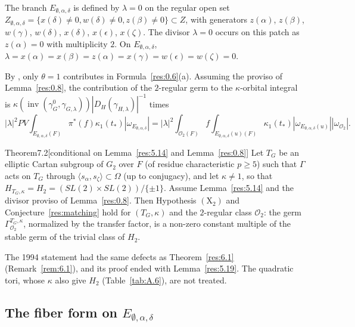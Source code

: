 \documentclass[12pt,letterpaper]{amsart}
\theoremstyle{plain}
\theoremstyle{definition}
\theoremstyle{remark}
\theoremstyle{definition}
\newcommand{\eps}{\epsilon}
\DeclareMathOperator{\inv}{inv}
\begin{document}
The branch $E_{\emptyset,\alpha,\delta}$ is defined by
$\lambda =0$ on the regular open set $Z_{\emptyset,\alpha,\delta}=
\{x(\delta)\not= 0,w(\delta)\not= 0,z(\beta)\not= 0\}\subset Z$,
with generators
$z(\alpha)$, $z(\beta)$, $w(\gamma)$, $w(\delta)$, $x(\delta)$,
$x(\epsilon)$, $x(\zeta)$. The divisor $\lambda =0$ occurs
on this patch as $z(\alpha)=0$ with multiplicity $2$.
On $E_{\emptyset,\alpha,\delta}$,
$\lambda=x(\alpha)=x(\beta)=z(\alpha)=x(\gamma)=w(\eps)=w(\zeta)=0$.

By \cite[Ch.~VI, \S2]{Ha92a}, only $\theta=1$
contributes in Formula~\ref{res:0.6}(a).
Assuming the proviso of Lemma~\ref{res:0.8}, the contribution of the
$2$-regular germ to the $\kappa$-orbital integral is
$\kappa(\inv(\gamma_G^0,\gamma_{G,\lambda}))
|D_H(\gamma_{H,\lambda})|^{-1}$ times
\begin{equation}\tag{7.1}\label{eq:7.1}
|\lambda|^2
PV\int_{E_{\emptyset,\alpha,\delta}(F)}\pi^*(f)
\kappa_1(t_*)
|\omega_{E_{\emptyset,\alpha,\delta}}|
=|\lambda|^2
\int_{{\mathcal O}_2(F)}f\int_{E_{\emptyset,\alpha,\delta}(u)(F)}
\kappa_1(t_*)
|\omega_{E_{\emptyset,\alpha,\delta}(u)}||\omega_{\mathcal O_2}|.
\end{equation}

\begin{res}{Theorem}{7.2}[conditional on Lemma~\ref{res:5.14} and Lemma~\ref{res:0.8}]\label{res:7.2}
Let $T_G$ be an elliptic Cartan subgroup
of $G_2$ over $F$ (of residue characteristic $p\ge 5$) such that $\Gamma$ acts
on $T_G$ through $\langle s_\alpha,s_\zeta\rangle\subset\Omega$ (up to
conjugacy), and let $\kappa\neq1$, so that
$H_{T_G,\kappa}=H_2=(SL(2)\times SL(2))/\{\pm 1\}$.
Assume Lemma~\ref{res:5.14} and the divisor proviso of Lemma~\ref{res:0.8}. Then
Hypothesis $(\mathrm X_2)$ and Conjecture~\ref{res:matching} hold for
$(T_G,\kappa)$ and the $2$-regular class $\mathcal O_2$: the germ
$\Gamma^{T_G,\kappa}_{\mathcal O_2}$, normalized by the transfer factor, is
a non-zero constant multiple of the stable germ of the trivial class of $H_2$.
\end{res}

\begin{rem26}\label{rem:7.2}
The 1994 statement had the same defects as Theorem~\ref{res:6.1}
(Remark~\ref{rem:6.1}), and its proof ended with Lemma~\ref{res:5.19}. The
quadratic tori, whose $\kappa$ also give $H_2$ (Table~\ref{tab:A.6}), are
not treated.
\end{rem26}

\subsection*{The fiber form on \texorpdfstring{$E_{\emptyset,\alpha,\delta}$}{E(0,alpha,delta)}}
\end{document}
